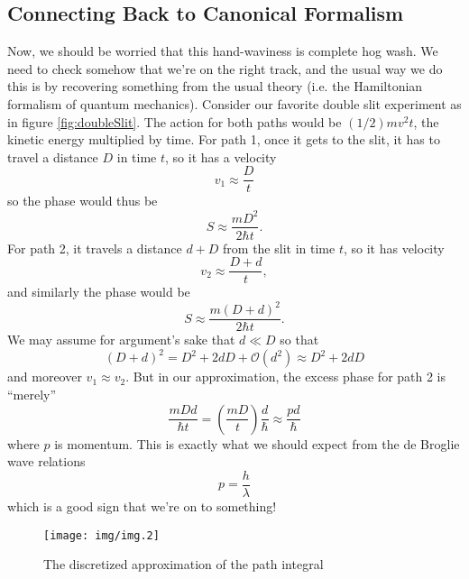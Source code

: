 \subsection{Connecting Back to Canonical Formalism}

Now, we should be worried that this hand-waviness is complete hog
wash. We need to check somehow that we're on the right track, and
the usual way we do this is by recovering something from the
usual theory (i.e. the Hamiltonian formalism of quantum
mechanics). Consider our favorite double slit experiment as in
figure \ref{fig:doubleSlit}. The action for both paths would be
$(1/2)mv^{2}t$, the kinetic energy multiplied by time. For path
1, once it gets to the slit, it has to travel a distance $D$ in
time $t$, so it has a velocity 
\begin{equation}%
v_{1} \approx \frac{D}{t}
\end{equation}
so the phase would thus be
\begin{equation}%
S\approx\frac{mD^{2}}{2\hbar{t}}.
\end{equation}
For path 2, it travels a distance $d+D$ from the slit in time
$t$, so it has velocity
\begin{equation}%
v_{2}\approx\frac{D+d}{t},
\end{equation}
and similarly the phase would be
\begin{equation}%
S\approx\frac{m(D+d)^{2}}{2\hbar{t}}.
\end{equation}
We may assume for argument's sake that $d\ll D$ so that
\begin{equation}%
(D+d)^{2} = D^{2}+2dD+\mathcal{O}(d^{2})\approx D^{2}+2dD
\end{equation}
and moreover $v_{1}\approx v_{2}$. But in our approximation, the
excess phase for path 2 is ``merely''
\begin{equation}%
\frac{mDd}{\hbar{t}}=\left(\frac{mD}{t}\right)\frac{d}{\hbar}\approx\frac{pd}{\hbar}
\end{equation}
where $p$ is momentum. This is exactly what we should expect from
the de Broglie wave relations 
\begin{equation}%
p = \frac{h}{\lambda}
\end{equation}
which is a good sign that we're on to something!


\begin{figure}[t]
\texttt{[image: img/img.2]}
\caption{The discretized approximation of the path integral}\label{fig:pathIntegralApprox}
\end{figure}


